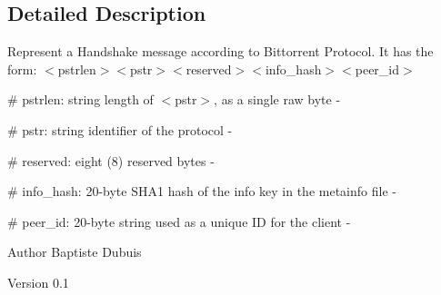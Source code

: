 \subsection{Detailed Description}
Represent a Handshake message according to Bittorrent Protocol. It has the form: $<$pstrlen$>$$<$pstr$>$$<$reserved$>$$<$info\_\-hash$>$$<$peer\_\-id$>$


\begin{DoxyItemize}
\item \# pstrlen: string length of $<$pstr$>$, as a single raw byte -\/
\item \# pstr: string identifier of the protocol -\/
\item \# reserved: eight (8) reserved bytes -\/
\item \# info\_\-hash: 20-\/byte SHA1 hash of the info key in the metainfo file -\/
\item \# peer\_\-id: 20-\/byte string used as a unique ID for the client -\/
\end{DoxyItemize}

\begin{DoxyAuthor}{Author}
Baptiste Dubuis 
\end{DoxyAuthor}
\begin{DoxyVersion}{Version}
0.1 
\end{DoxyVersion}


